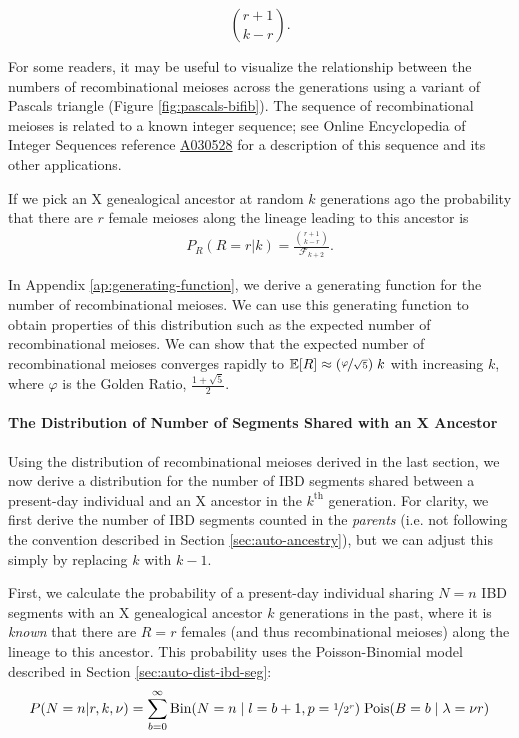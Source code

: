 \documentclass[11pt]{article}
\newcommand{\E}{\mathbb{E}}
\begin{document}
\begin{equation}
{ r + 1 \choose k - r}.
\end{equation}

For some readers, it may be useful to visualize the relationship between the
numbers of recombinational meioses across the generations using a variant of
Pascals triangle (Figure \ref{fig:pascals-bifib}). The sequence of
recombinational meioses is related to a known integer sequence; see Online
Encyclopedia of Integer Sequences reference
\href{https://oeis.org/A030528}{A030528} \citep{sloane2014online} for a
description of this sequence and its other applications.

If we pick an X genealogical ancestor at random $k$ generations ago the
probability that there are $r$ female meioses along the lineage leading to this
ancestor is
\begin{align}
  \label{eq:recomb-pmf}
  P_R(R = r | k) = \frac{{r + 1 \choose k - r}}{\mathcal{F}_{k+2}}.
\end{align}

In Appendix \ref{ap:generating-function}, we derive a generating function for
the number of recombinational meioses. We can use this generating function to
obtain properties of this distribution such as the expected number of
recombinational meioses. We can show that the expected number of
recombinational meioses converges rapidly to $\E[R] \approx
(\nicefrac{\varphi}{\sqrt{5}}) \; k$ with increasing $k$, where $\varphi$ is
the Golden Ratio, $\frac{1 + \sqrt{5}}{2}$.

\paragraph{The Distribution of Number of Segments Shared with an X Ancestor}

Using the distribution of recombinational meioses derived in the last section,
we now derive a distribution for the number of IBD segments shared between a
present-day individual and an X ancestor in the $k^\text{th}$ generation. For
clarity, we first derive the number of IBD segments counted in the
\emph{parents} (i.e. not following the convention described in Section
\ref{sec:auto-ancestry}), but we can adjust this simply by replacing $k$ with
$k-1$.

First, we calculate the probability of a present-day individual sharing $N=n$
IBD segments with an X genealogical ancestor $k$ generations in the past, where
it is \emph{known} that there are $R=r$ females (and thus recombinational
meioses) along the lineage to this ancestor. This probability uses the
Poisson-Binomial model described in Section \ref{sec:auto-dist-ibd-seg}:
%
\begin{equation}
  \label{eq:likelihood-n}
  P(N=n | r, k, \nu) = \sum_{b=0}^\infty \text{Bin}(N=n \;|\; l=b+1, p=\nicefrac{1}{2^r}) \; \text{Pois}(B=b \;|\; \lambda=\nu r)
\end{equation}
%
\end{document}
